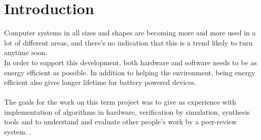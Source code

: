 \chapter{Introduction}
Computer systems in all sizes and shapes are becoming more and more used in a lot of different areas, and there's no indication that this is a trend likely to turn anytime soon.\\
In order to support this development, both hardware and software needs to be as energy efficient as possible. In addition to helping the environment, being energy efficient also gives longer lifetime for battery powered devices.
\\\\
The goals for the work on this term project was to give us experience with implementation of algorithms in hardware, verification by simulation, synthesis tools and to understand and evaluate other people's work by a peer-review system. \cite{ggmanual}.\cite{rsahardware}

